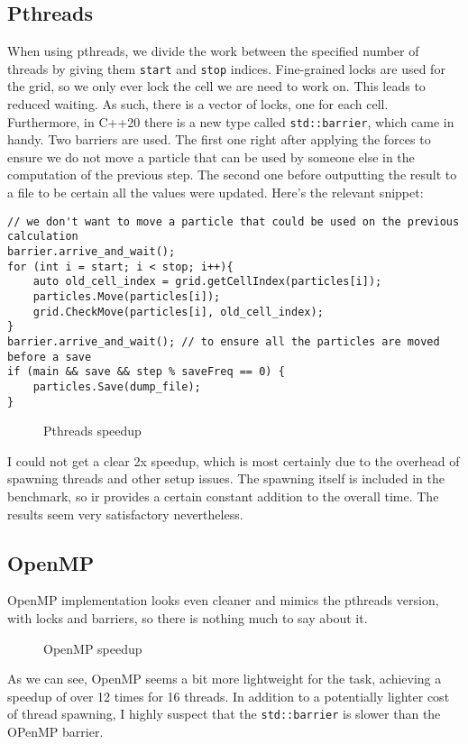 \documentclass[a4paper,11pt]{article}
\begin{document}
\subsection{Pthreads}
When using pthreads, we divide the work between the specified number of threads
by giving them \texttt{start} and \texttt{stop} indices. Fine-grained locks are
used for the grid, so we only ever lock the cell we are need to work on. This
leads to reduced waiting. As such, there is a vector of locks, one for each cell.
Furthermore, in C++20 there is a new type called \texttt{std::barrier}, which
came in handy.  Two barriers are used. The first one right after applying the
forces to ensure we do not move a particle that can be used by someone else in
the computation of the previous step. The second one before outputting the
result to a file to be certain all the values were updated.  Here's the relevant
snippet:
\begin{verbatim}
// we don't want to move a particle that could be used on the previous calculation
barrier.arrive_and_wait();
for (int i = start; i < stop; i++){
    auto old_cell_index = grid.getCellIndex(particles[i]);
    particles.Move(particles[i]);
    grid.CheckMove(particles[i], old_cell_index);
}
barrier.arrive_and_wait(); // to ensure all the particles are moved before a save
if (main && save && step % saveFreq == 0) {
    particles.Save(dump_file);
}
\end{verbatim}
\begin{figure}[H]
    
    \centering
    \caption{Pthreads speedup}
\end{figure}
I could not get a clear 2x speedup, which is most certainly due to the overhead
of spawning threads and other setup issues.  The spawning itself is included in
the benchmark, so ir provides a certain constant addition to the overall time.
The results seem very satisfactory nevertheless.
\subsection{OpenMP}
OpenMP implementation looks even cleaner and mimics the pthreads version, with
locks and barriers, so there is nothing much to say about it.
\begin{figure}[H]
    
    \centering
    \caption{OpenMP speedup}
\end{figure}

As we can see, OpenMP seems a bit more lightweight for the task, achieving a
speedup of over 12 times for 16 threads. In addition to a potentially lighter
cost of thread spawning, I highly suspect that the \texttt{std::barrier} is
slower than the OPenMP barrier.
\end{document}
